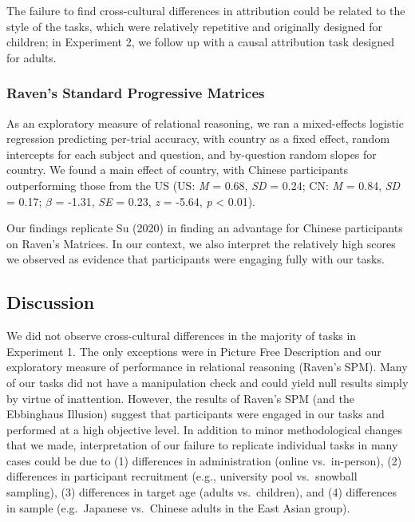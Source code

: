 \documentclass[
  man,floatsintext]{apa6}
\begin{document}
The failure to find cross-cultural differences in attribution could be related to the style of the tasks, which were relatively repetitive and originally designed for children; in Experiment 2, we follow up with a causal attribution task designed for adults.

\hypertarget{ravens-standard-progressive-matrices-1}{%
\subsubsection{Raven's Standard Progressive Matrices}\label{ravens-standard-progressive-matrices-1}}

As an exploratory measure of relational reasoning, we ran a mixed-effects logistic regression predicting per-trial accuracy, with country as a fixed effect, random intercepts for each subject and question, and by-question random slopes for country. We found a main effect of country, with Chinese participants outperforming those from the US (US: \emph{M} = 0.68, \emph{SD} = 0.24; CN: \emph{M} = 0.84, \emph{SD} = 0.17; \(\beta\) = -1.31, \emph{SE} = 0.23, \emph{z} = -5.64, \emph{p} \textless{} 0.01).

Our findings replicate Su (2020) in finding an advantage for Chinese participants on Raven's Matrices. In our context, we also interpret the relatively high scores we observed as evidence that participants were engaging fully with our tasks.

\hypertarget{discussion}{%
\subsection{Discussion}\label{discussion}}

We did not observe cross-cultural differences in the majority of tasks in Experiment 1. The only exceptions were in Picture Free Description and our exploratory measure of performance in relational reasoning (Raven's SPM). Many of our tasks did not have a manipulation check and could yield null results simply by virtue of inattention. However, the results of Raven's SPM (and the Ebbinghaus Illusion) suggest that participants were engaged in our tasks and performed at a high objective level. In addition to minor methodological changes that we made, interpretation of our failure to replicate individual tasks in many cases could be due to (1) differences in administration (online vs.~in-person), (2) differences in participant recruitment (e.g., university pool vs.~snowball sampling), (3) differences in target age (adults vs.~children), and (4) differences in sample (e.g.~Japanese vs.~Chinese adults in the East Asian group).
\end{document}
